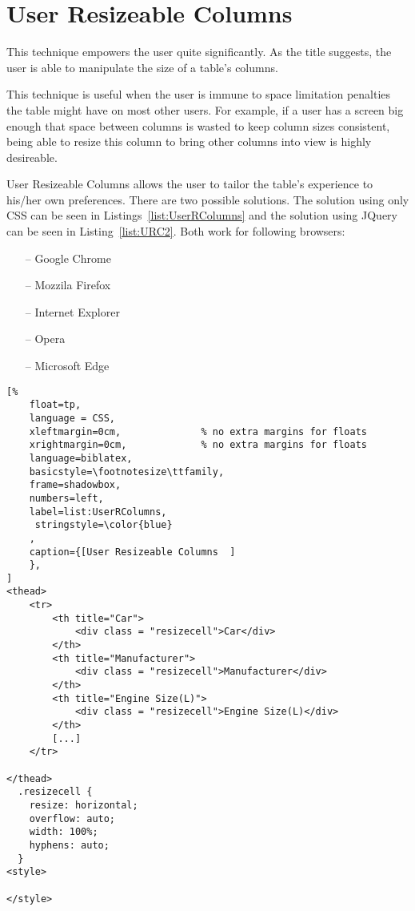 \section{User Resizeable Columns}
This technique empowers the user quite significantly. As the title
suggests, the user is able to manipulate the size of a table's
columns. 

This technique is useful when the user is immune to space limitation
penalties the table might have on most other users. For example, if a
user has a screen big enough that space between columns is wasted to
keep column sizes consistent, being able to resize this column to
bring other columns into view is highly desireable.

User Resizeable Columns allows the user to tailor the table's
experience to his/her own preferences. There are two possible solutions. 
The solution using only CSS can be seen in Listings~\ref{list:UserRColumns} 
and the solution using JQuery can be seen in Listing~\ref{list:URC2}. 
Both work for following browsers:
\begin{itemize}
    \item[--] Google Chrome
    \item[--] Mozzila Firefox
    \item[--] Internet Explorer
    \item[--] Opera
    \item[--] Microsoft Edge
\end{itemize}

\begin{lstlisting}[%
    float=tp,
    language = CSS,
    xleftmargin=0cm,              % no extra margins for floats
    xrightmargin=0cm,             % no extra margins for floats
    language=biblatex,
    basicstyle=\footnotesize\ttfamily,
    frame=shadowbox,
    numbers=left,
    label=list:UserRColumns,
     stringstyle=\color{blue}
    ,
    caption={[User Resizeable Columns  ]
    },
]
<thead>
    <tr>
        <th title="Car">
            <div class = "resizecell">Car</div>
        </th>
        <th title="Manufacturer">
            <div class = "resizecell">Manufacturer</div>
        </th>
        <th title="Engine Size(L)">
            <div class = "resizecell">Engine Size(L)</div>
        </th>
        [...]
    </tr>

</thead>
  .resizecell {
    resize: horizontal;
    overflow: auto;
    width: 100%;
    hyphens: auto;
  }
<style>

</style>
\end{lstlisting}

